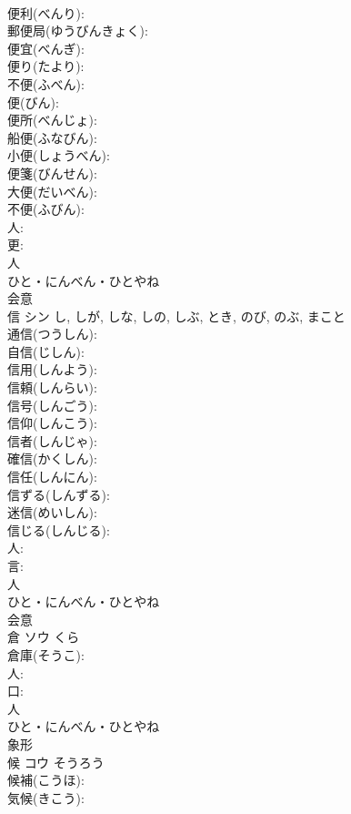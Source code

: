 \documentclass[8pt]{extreport}
\begin{document}
\begin{CJK}{UTF8}{min}
\\	便利(べんり): 
\\	郵便局(ゆうびんきょく): 
\\	便宜(べんぎ): 
\\	便り(たより): 
\\	不便(ふべん): 
\\	便(びん): 
\\	便所(べんじょ): 
\\	船便(ふなびん): 
\\	小便(しょうべん): 
\\	便箋(びんせん): 
\\	大便(だいべん): 
\\	不便(ふびん): 
\\	人: 
\\	更: 
\\	人	
\\	ひと・にんべん・ひとやね	
\\	会意 
\\	信	シン		し, しが, しな, しの, しぶ, とき, のび, のぶ, まこと	
\\	通信(つうしん): 
\\	自信(じしん): 
\\	信用(しんよう): 
\\	信頼(しんらい): 
\\	信号(しんごう): 
\\	信仰(しんこう): 
\\	信者(しんじゃ): 
\\	確信(かくしん): 
\\	信任(しんにん): 
\\	信ずる(しんずる): 
\\	迷信(めいしん): 
\\	信じる(しんじる): 
\\	人: 
\\	言: 
\\	人	
\\	ひと・にんべん・ひとやね	
\\	会意 
\\	倉	ソウ	くら		
\\	倉庫(そうこ): 
\\	人: 
\\	口: 
\\	人	
\\	ひと・にんべん・ひとやね	
\\	象形 
\\	候	コウ	そうろう		
\\	候補(こうほ): 
\\	気候(きこう): 

\end{CJK}
\end{document}
